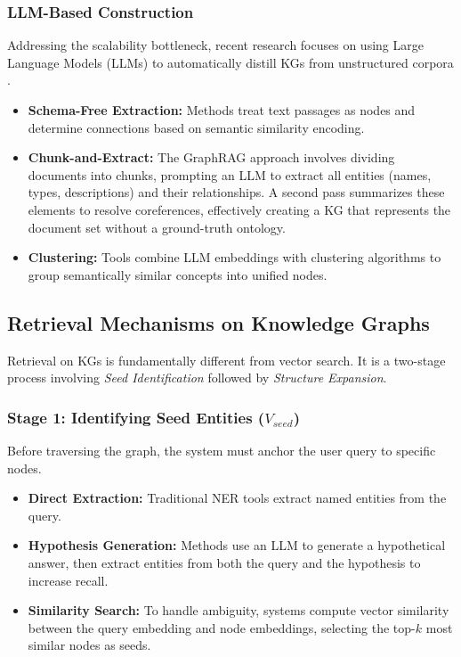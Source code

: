 \documentclass[a4paper, 12pt]{extreport}
\begin{document}
\subsubsection{LLM-Based Construction}
Addressing the scalability bottleneck, recent research focuses on using Large Language Models (LLMs) to automatically distill KGs from unstructured corpora \cite{graphrag2025}.
\begin{itemize}
    \item[] \textbf{Schema-Free Extraction:} Methods treat text passages as nodes and determine connections based on semantic similarity encoding.
    \item[] \textbf{Chunk-and-Extract:} The GraphRAG approach involves dividing documents into chunks, prompting an LLM to extract all entities (names, types, descriptions) and their relationships. A second pass summarizes these elements to resolve coreferences, effectively creating a KG that represents the document set without a ground-truth ontology.
    \item[] \textbf{Clustering:} Tools combine LLM embeddings with clustering algorithms to group semantically similar concepts into unified nodes.
\end{itemize}


\subsection{Retrieval Mechanisms on Knowledge Graphs}
Retrieval on KGs is fundamentally different from vector search. It is a two-stage process involving \textit{Seed Identification} followed by \textit{Structure Expansion}.

\subsubsection{Stage 1: Identifying Seed Entities ($V_{seed}$)}
Before traversing the graph, the system must anchor the user query to specific nodes.
\begin{itemize}
    \item[] \textbf{Direct Extraction:} Traditional NER tools extract named entities from the query.
    \item[] \textbf{Hypothesis Generation:} Methods use an LLM to generate a hypothetical answer, then extract entities from both the query and the hypothesis to increase recall.
    \item[] \textbf{Similarity Search:} To handle ambiguity, systems compute vector similarity between the query embedding and node embeddings, selecting the top-$k$ most similar nodes as seeds.
\end{itemize}
\end{document}
